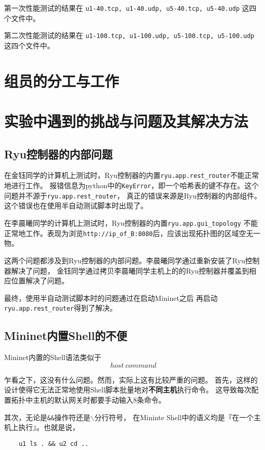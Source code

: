 第一次性能测试的结果在 \texttt{u1-40.tcp, u1-40.udp, u5-40.tcp, u5-40.udp} 这四个文件中。

第二次性能测试的结果在 \texttt{u1-100.tcp, u1-100.udp, u5-100.tcp, u5-100.udp} 这四个文件中。

\section{组员的分工与工作}

\section{实验中遇到的挑战与问题及其解决方法}

\subsection{Ryu控制器的内部问题}

在金钰同学的计算机上测试时，Ryu控制器的内置\texttt{ryu.app.rest\_router}不能正常地进行工作。
报错信息为python中的\texttt{KeyError}，即一个哈希表的键不存在。这个问题并不源于\texttt{ryu.app.rest\_router}，
真正的错误来源是Ryu控制器的内部组件。这个错误也在使用半自动测试脚本时出现了。

在李晨曦同学的计算机上测试时，Ryu控制器的内置\texttt{ryu.app.gui\_topology}
不能正常地工作。表现为浏览\texttt{http://ip\_of\_B:8080}后，应该出现拓扑图的区域空无一物。

这两个问题都涉及到Ryu控制器的内部问题。李晨曦同学通过重新安装了Ryu控制器解决了问题，
金钰同学通过拷贝李晨曦同学主机上的的Ryu控制器并覆盖到相应位置解决了问题。

最终，使用半自动测试脚本时的问题通过在启动Mininet之后
再启动\texttt{ryu.app.rest\_router}得到了解决。

\subsection{Mininet内置Shell的不便}

Mininet内置的Shell语法类似于
$$ host\ command $$

乍看之下，这没有什么问题。然而，实际上这有比较严重的问题。
首先，这样的设计使得它无法正常地使用Shell脚本批量地对\textbf{不同主机}执行命令。
这导致每次配置拓扑中主机的默认网关时都要手动输入8条命令。

其次，无论是\texttt{\&\&}操作符还是\texttt{$\backslash$}分行符号，
在Mininte Shell中的语义均是『在一个主机上执行』。也就是说，

\begin{lstlisting}
	u1 ls . && u2 cd ..
\end{lstlisting}

